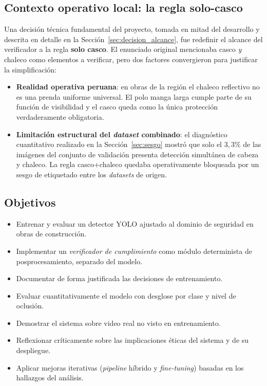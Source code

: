 \documentclass[journal,onecolumn,11pt]{IEEEtran}
\begin{document}
\subsection{Contexto operativo local: la regla solo-casco}
\label{sec:contexto_local}

Una decisión técnica fundamental del proyecto, tomada en mitad del
desarrollo y descrita en detalle en la
Sección~\ref{sec:decision_alcance}, fue redefinir el alcance del
verificador a la regla \textbf{solo casco}. El enunciado original
mencionaba casco \emph{y} chaleco como elementos a verificar, pero
dos factores convergieron para justificar la simplificación:

\begin{itemize}[leftmargin=*]
    \item \textbf{Realidad operativa peruana}: en obras de la región
    el chaleco reflectivo no es una prenda uniforme universal. El
    polo manga larga cumple parte de su función de visibilidad y el
    casco queda como la única protección verdaderamente obligatoria.
    \item \textbf{Limitación estructural del \textit{dataset}
    combinado}: el diagnóstico cuantitativo realizado en la
    Sección~\ref{sec:sesgo} mostró que solo el $3{,}3\%$ de las
    imágenes del conjunto de validación presenta detección
    simultánea de cabeza y chaleco. La regla casco+chaleco quedaba
    operativamente bloqueada por un sesgo de etiquetado entre los
    \textit{datasets} de origen.
\end{itemize}

\subsection{Objetivos}

\begin{itemize}
    \item Entrenar y evaluar un detector YOLO ajustado al dominio
    de seguridad en obras de construcción.
    \item Implementar un \textit{verificador de cumplimiento} como
    módulo determinista de posprocesamiento, separado del modelo.
    \item Documentar de forma justificada las decisiones de
    entrenamiento.
    \item Evaluar cuantitativamente el modelo con desglose por
    clase y nivel de oclusión.
    \item Demostrar el sistema sobre video real no visto en
    entrenamiento.
    \item Reflexionar críticamente sobre las implicaciones éticas
    del sistema y de su despliegue.
    \item Aplicar mejoras iterativas (\textit{pipeline} híbrido y
    \textit{fine-tuning}) basadas en los hallazgos del análisis.
\end{itemize}
\end{document}
